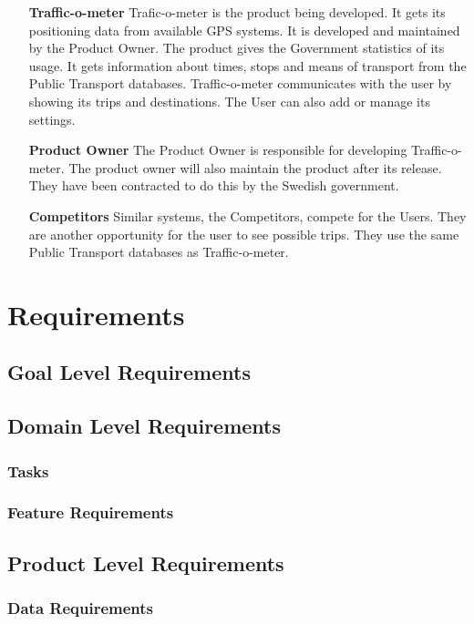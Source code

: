 \documentclass[a4paper]{article}
\begin{document}
\begin{itemize}
			\item[\textbf{Traffic-o-meter}] Trafic-o-meter is the product being developed. It gets its positioning data from available GPS systems. It is developed and maintained by the Product Owner. The product gives the Government statistics of its usage. It gets information about times, stops and means of transport from the Public Transport databases. Traffic-o-meter communicates with the user by showing its trips and destinations. The User can also add or manage its settings.
			\item[\textbf{Product Owner}] The Product Owner is responsible for  developing Traffic-o-meter. The product owner will also maintain the product after its release. They have been contracted to do this by the Swedish government.		
			\item[\textbf{Competitors}] Similar systems, the Competitors, compete for the Users. They are another opportunity for the user to see possible trips. They use the same Public Transport databases as Traffic-o-meter.
		\end{itemize}

	
	
	
	\section{Requirements}
		\subsection{Goal Level Requirements}
			
		\subsection{Domain Level Requirements}
			\subsubsection{Tasks}
				
			\subsubsection{Feature Requirements}

								
		
		\pagebreak		
	
		\subsection{Product Level Requirements}		
			\subsubsection{Data Requirements}
			
\end{document}
